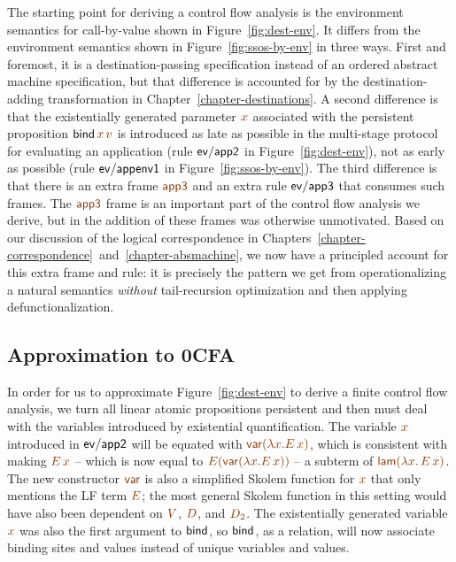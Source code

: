 The starting point for deriving a control flow analysis is the
environment semantics for call-by-value shown in
Figure~\ref{fig:dest-env}. It differs from the environment semantics
shown in Figure~\ref{fig:ssos-by-env} in three ways. First and
foremost, it is a destination-passing specification instead of an
ordered abstract machine specification, but that difference is
accounted for by the destination-adding transformation in 
Chapter~\ref{chapter-destinations}.
A second difference is that the existentially generated parameter
$\lf{x}$ associated with the persistent proposition ${\sf
  bind}\,\lf{x}\,\lf{v}$ is introduced as late as possible in the
multi-stage protocol for evaluating an application (rule ${\sf
  ev/app2}$ in Figure~\ref{fig:dest-env}), not as early as possible
(rule ${\sf ev/appenv1}$ in Figure~\ref{fig:ssos-by-env}). The third
difference is that there is an extra frame $\lf{\sf app3}$ and an
extra rule ${\sf ev/app3}$ that consumes such frames. The $\lf{\sf
  app3}$ frame is an important part of the control flow analysis we
derive, but in \cite{simmons11logical} the addition of these frames
was otherwise unmotivated. Based on our discussion of the logical
correspondence in 
Chapters~\ref{chapter-correspondence}~and~\ref{chapter-absmachine}, 
we now have a principled account for this
extra frame and rule: it is precisely the pattern we get from
operationalizing a natural semantics {\it without} tail-recursion
optimization and then applying defunctionalization.

\subsection{Approximation to 0CFA}

In order for us to approximate Figure~\ref{fig:dest-env} to derive a
finite control flow analysis, we turn all linear atomic propositions
persistent and then must deal with the variables introduced by
existential quantification. The variable $\lf{x}$ introduced in ${\sf
  ev/app2}$ will be equated with $\lf{{\sf var}(\lambda x.E\,x)}$,
which is consistent with making $\lf{E\,x}$ -- which is now equal to
$\lf{E({\sf var}(\lambda x.E\,x))}$ -- a subterm of $\lf{{\sf lam}(\lambda x.\, E\,x)}$.  The new
constructor $\lf{\sf var}$ is also a simplified Skolem
function for $\lf{x}$ that only mentions the LF term $\lf{E}$; the
most general Skolem function in this setting would have also been
dependent on $\lf{V}$, $\lf{D}$, and $\lf{D_2}$. The existentially
generated variable $\lf x$ was also the first argument to ${\sf bind}$,
so ${\sf bind}$, as a relation, will now associate binding sites
and values instead of unique variables and values. 

